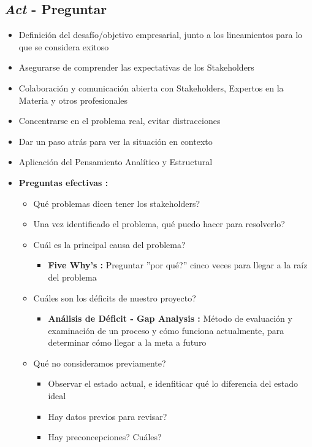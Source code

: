 \subsection{\textit{Act} - Preguntar}
\begin{itemize}
    \item {Definición del desafío/objetivo empresarial, junto a los lineamientos para lo que se considera exitoso}
    \item {Asegurarse de comprender las expectativas de los Stakeholders}
    \item {Colaboración y comunicación abierta con Stakeholders, Expertos en la Materia y otros profesionales}
    \item {Concentrarse en el problema real, evitar distracciones}
    \item {Dar un paso atrás para ver la situación en contexto}
    \item {Aplicación del Pensamiento Analítico y Estructural}
    \item {\textbf{Preguntas efectivas : }
    \begin{itemize}
        \item {Qué problemas dicen tener los stakeholders?}
        \item {Una vez identificado el problema, qué puedo hacer para resolverlo?}
        \item {Cuál es la principal causa del problema?
        \begin{itemize}
            \item {\textbf{Five Why's : }Preguntar ''por qué?'' cinco veces para llegar a la raíz del problema}
        \end{itemize}}
        \item {Cuáles son los déficits de nuestro proyecto?
        \begin{itemize}
            \item {\textbf{Análisis de Déficit - Gap Analysis : }Método de evaluación y examinación de un proceso y cómo funciona actualmente, para determinar cómo llegar a la meta a futuro}
        \end{itemize}}
        \item {Qué no consideramos previamente?
        \begin{itemize}
            \item {Observar el estado actual, e idenfiticar qué lo diferencia del estado ideal}
            \item {Hay datos previos para revisar?}
            \item {Hay preconcepciones? Cuáles?}

\end{itemize}}
\end{itemize}}
\end{itemize}
